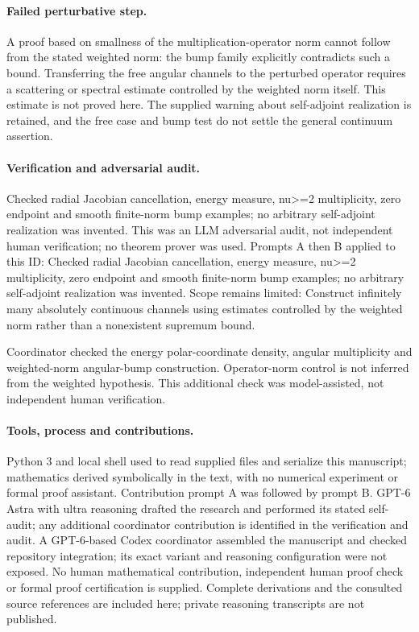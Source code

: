 \documentclass[11pt]{article}
\begin{document}
\paragraph{Failed perturbative step.}A proof based on smallness of the multiplication-operator norm cannot follow from the stated weighted norm: the bump family explicitly contradicts such a bound. Transferring the free angular channels to the perturbed operator requires a scattering or spectral estimate controlled by the weighted norm itself. This estimate is not proved here. The supplied warning about self-adjoint realization is retained, and the free case and bump test do not settle the general continuum assertion.

\paragraph{Verification and adversarial audit.}
Checked radial Jacobian cancellation, energy measure, nu>=2 multiplicity, zero endpoint and smooth finite-norm bump examples; no arbitrary self-adjoint realization was invented. This was an LLM adversarial audit, not independent human verification; no theorem prover was used. Prompts A then B applied to this ID: Checked radial Jacobian cancellation, energy measure, nu>=2 multiplicity, zero endpoint and smooth finite-norm bump examples; no arbitrary self-adjoint realization was invented. Scope remains limited: Construct infinitely many absolutely continuous channels using estimates controlled by the weighted norm rather than a nonexistent supremum bound.

Coordinator checked the energy polar-coordinate density, angular multiplicity and weighted-norm angular-bump construction. Operator-norm control is not inferred from the weighted hypothesis. This additional check was model-assisted, not independent human verification.

\paragraph{Tools, process and contributions.}
Python 3 and local shell used to read supplied files and serialize this manuscript; mathematics derived symbolically in the text, with no numerical experiment or formal proof assistant. Contribution prompt A was followed by prompt B. GPT-6 Astra with ultra reasoning drafted the research and performed its stated self-audit; any additional coordinator contribution is identified in the verification and audit. A GPT-6-based Codex coordinator assembled the manuscript and checked repository integration; its exact variant and reasoning configuration were not exposed. No human mathematical contribution, independent human proof check or formal proof certification is supplied. Complete derivations and the consulted source references are included here; private reasoning transcripts are not published.
\end{document}
